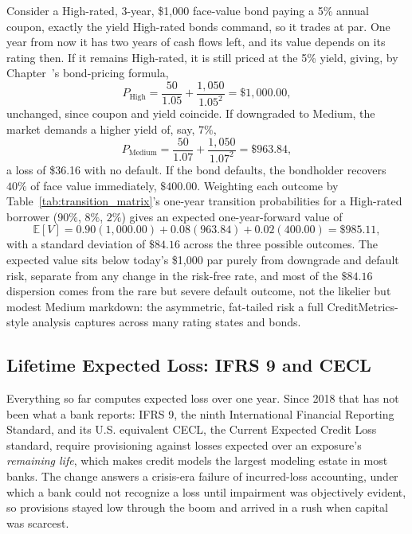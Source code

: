 \documentclass[../ai_in_finance]{subfiles}
\begin{document}
Consider a High-rated, 3-year, \$1,000 face-value bond paying a 5\% annual coupon, exactly the yield High-rated bonds command, so it trades at par. One year from now it has two years of cash flows left, and its value depends on its rating then. If it remains High-rated, it is still priced at the 5\% yield, giving, by Chapter~'s bond-pricing formula,
\begin{equation*}
P_{\text{High}} = \frac{50}{1.05} + \frac{1{,}050}{1.05^2} = \$1{,}000.00,
\end{equation*}
unchanged, since coupon and yield coincide. If downgraded to Medium, the market demands a higher yield of, say, $7\%$,
\begin{equation*}
P_{\text{Medium}} = \frac{50}{1.07} + \frac{1{,}050}{1.07^2} = \$963.84,
\end{equation*}
a loss of \$36.16 with no default. If the bond defaults, the bondholder recovers $40\%$ of face value immediately, $\$400.00$. Weighting each outcome by Table~\ref{tab:transition_matrix}'s one-year transition probabilities for a High-rated borrower ($90\%$, $8\%$, $2\%$) gives an expected one-year-forward value of
\begin{equation*}
\mathbb{E}[V] = 0.90(1{,}000.00) + 0.08(963.84) + 0.02(400.00) = \$985.11,
\end{equation*}
with a standard deviation of $\$84.16$ across the three possible outcomes.
The expected value sits below today's \$1,000 par purely from downgrade and default risk, separate from any change in the risk-free rate, and most of the $\$84.16$ dispersion comes from the rare but severe default outcome, not the likelier but modest Medium markdown: the asymmetric, fat-tailed risk a full CreditMetrics-style analysis captures across many rating states and bonds.


\subsection{Lifetime Expected Loss: IFRS 9 and CECL}
\label{sec:lifetime-ecl}

Everything so far computes expected loss over one year. Since 2018 that has not been what a bank reports: IFRS 9, the ninth International Financial Reporting Standard, and its U.S. equivalent CECL, the Current Expected Credit Loss standard, require provisioning against losses expected over an exposure's \emph{remaining life}, which makes credit models the largest modeling estate in most banks. The change answers a crisis-era failure of incurred-loss accounting, under which a bank could not recognize a loss until impairment was objectively evident, so provisions stayed low through the boom and arrived in a rush when capital was scarcest.
\end{document}
